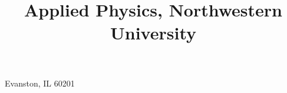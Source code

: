 \usepackage{textcomp}

\usepackage[margin=0.75in]{geometry}


\makeatletter %
\makeatother  %



\setlength{\hintscolumnwidth}{2.2cm}


\title{
    Applied Physics, \texorpdfstring{\newline}{}
    Northwestern University
}

\address{1100 Church St, Apt 303}{Evanston, IL 60201}


\usepackage{multibib} %



